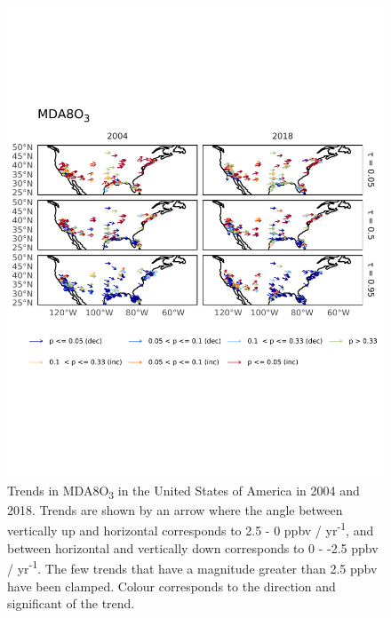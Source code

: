 \documentclass{article}
\begin{document}
\begin{figure}[p]
\centering
\includegraphics[height=0.9\textheight]{figures/si_figures/fS07_o3_map_mda8_all_us_o3.pdf}
\caption{Trends in MDA8O\textsubscript{3} in the United States of America in 2004 and 2018. Trends are shown by an arrow where the angle between vertically up and horizontal corresponds to 2.5 - 0 ppbv / yr\textsuperscript{-1}, and between horizontal and vertically down corresponds to 0 - -2.5 ppbv / yr\textsuperscript{-1}. The few trends that have a magnitude greater than 2.5 ppbv have been clamped. Colour corresponds to the direction and significant of the trend.}
\label{si_fig:o3_map_us_mda8}
\end{figure}
\clearpage
\end{document}
